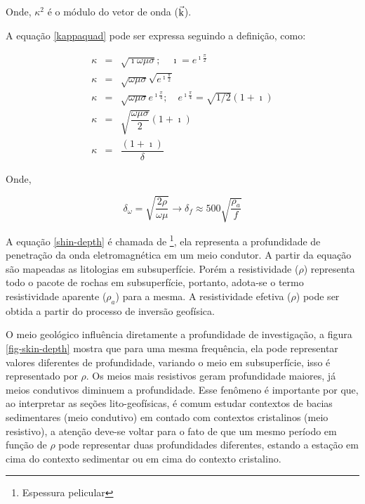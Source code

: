         \noindent Onde, $\kappa^2$ é o módulo do vetor de onda ($\vec{\textrm{k}}$).
        
        A equação \ref{kappaquad} pode ser expressa seguindo a definição, como:
        
        {\setlength\arraycolsep{2pt}
        \begin{eqnarray}
            \kappa & = & \sqrt{\imath \omega \mu \sigma}; \quad \imath = e^{\imath \frac{\pi}{2}} \nonumber \\
            \kappa & = & \sqrt{\omega \mu \sigma} \sqrt{e^{\imath \frac{\pi}{2}}} \nonumber \\
            \kappa & = & \sqrt{\omega \mu \sigma} e^{\imath \frac{\pi}{4}}; \quad e^{\imath \frac{\pi}{4}} = \sqrt{1/2} (1 + \imath) \nonumber \\
            \kappa & = & \sqrt{\dfrac{\omega \mu \sigma}{2}} (1 + \imath) \nonumber \\
            \kappa & = & \dfrac{(1 + \imath)}{\delta}
        \end{eqnarray}} 
        
        \noindent Onde,
        
        \begin{equation}
            \label{shin-depth}
            \delta_\omega = \sqrt{\dfrac{2 \rho}{\omega \mu}} \longrightarrow \delta_f \approx 500  \sqrt{\frac{\rho_a}{f}}
        \end{equation}
        
        A equação \ref{shin-depth} é chamada de \footnote{Espessura pelicular}, ela representa a profundidade de penetração da onda eletromagnética em um meio condutor.
        A partir da equação são mapeadas as litologias em subsuperfície. Porém a resistividade ($\rho$) representa todo o pacote de rochas em subsuperfície, portanto, adota-se o termo resistividade aparente ($\rho_a$) para a mesma. A resistividade efetiva ($\rho$) pode ser obtida a partir do processo de inversão geofísica.        

        O meio geológico influência diretamente a profundidade de investigação, a figura \ref{fig-skin-depth} mostra que para uma mesma frequência, ela pode representar valores diferentes de profundidade, variando o meio em subsuperfície, isso é representado por $\rho$. Os meios mais resistivos geram profundidade maiores, já meios condutivos diminuem a profundidade. Esse fenômeno é importante por que, ao interpretar as seções lito-geofísicas, é comum estudar contextos de bacias sedimentares (meio condutivo) em contado com contextos cristalinos (meio resistivo), a atenção deve-se voltar para o fato de que um mesmo período em função de $\rho$ pode representar duas profundidades diferentes, estando a estação em cima do contexto sedimentar ou em cima do contexto cristalino. 
        

